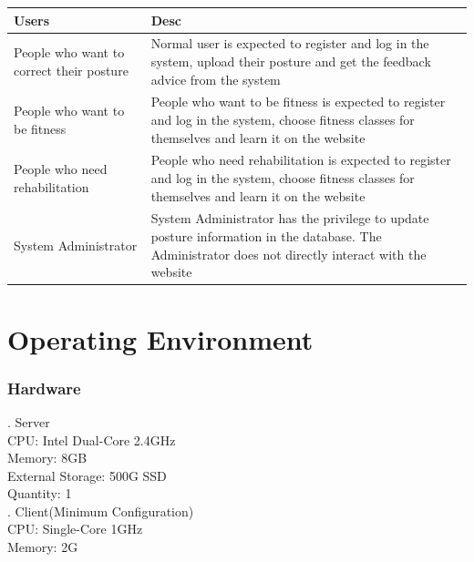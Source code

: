 \documentclass[16pt]{scrreprt}
\begin{document}
 
\begin{center}
    \begin{tabular}{p{5cm}p{11cm}}
        \hline
        Users & Desc\\
        \hline
        People who want to correct their posture &  Normal user is expected to register and log in the system, upload their posture and get the feedback advice from the system\\
        \hline
        People who want to be fitness & People who want to be fitness is expected to register and log in the system, choose fitness classes for themselves and learn it on the website\\
        \hline
        People who need rehabilitation & People who need rehabilitation is expected to register and log in the system, choose fitness classes for themselves and learn it on the website\\
        \hline
        System Administrator & System Administrator has the privilege to update posture information in the database. The Administrator does not directly interact with the website\\
        \hline
    \end{tabular}
\end{center}

 
\section{Operating Environment}

 
\subsubsection{Hardware}

 
. Server\\

 
CPU: Intel Dual-Core 2.4GHz\\

 
Memory: 8GB\\

 
External Storage: 500G SSD\\

 
Quantity: 1\\

 
. Client(Minimum Configuration)\\

 
CPU: Single-Core 1GHz\\

 
Memory: 2G\\
\end{document}
